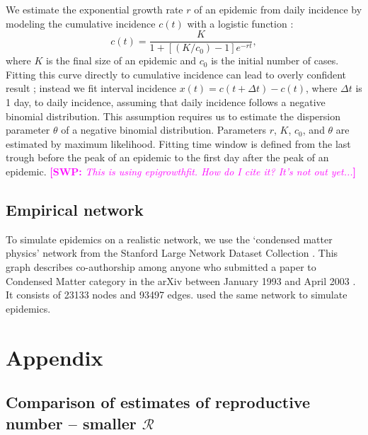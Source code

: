 \documentclass[12pt]{article}
\newcommand{\RR}{\ensuremath{{\mathcal R}}}
\newcommand{\comment}[3]{\textcolor{#1}{\textbf{[#2: }\textsl{#3}\textbf{]}}}
\newcommand{\swp}[1]{\comment{magenta}{SWP}{#1}}
\begin{document}
We estimate the exponential growth rate $r$ of an epidemic from daily incidence by modeling the cumulative incidence $c(t)$ with a logistic function \citep{ma2014estimating}: 
\begin{equation}
c(t) = \frac{K}{1 + \left[(K/c_0) - 1\right] e^{-rt}},
\end{equation}
where $K$ is the final size of an epidemic and $c_0$ is the initial number of cases.
Fitting this curve directly to cumulative incidence can lead to overly confident result \citep{king2015avoidable}; instead we fit interval incidence $x(t) = c(t + \Delta t) - c(t)$, where $\Delta t$ is 1 day, to daily incidence, assuming that daily incidence follows a negative binomial distribution. 
This assumption requires us to estimate the dispersion parameter $\theta$ of a negative binomial distribution.
Parameters $r$, $K$, $c_0$, and $\theta$ are estimated by maximum likelihood.
Fitting time window is defined from the last trough before the peak of an epidemic to the first day after the peak of an epidemic.
\swp{This is using epigrowthfit. How do I cite it? It's not out yet...}

\subsection{Empirical network}

To simulate epidemics on a realistic network, we use the `condensed matter physics' network from the Stanford Large Network Dataset Collection \citep{leskovec2016snap}.
This graph describes co-authorship among anyone who submitted a paper to Condensed Matter category in the arXiv between January 1993 and April 2003 \citep{leskovec2007graph}.
It consists of 23133 nodes and 93497 edges.
\cite{trapman2016inferring} used the same network to simulate epidemics.

\pagebreak
\appendix
\section{Appendix}

\subsection{Comparison of estimates of reproductive number -- smaller $\RR$}
\pagebreak
\end{document}
